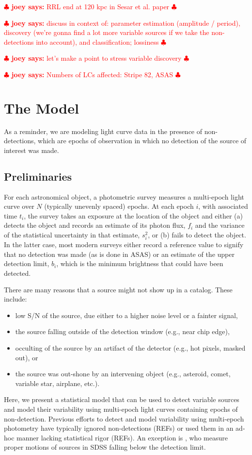 \documentclass[12pt,preprint]{aastex}
\newcommand{\fobs}{f_i}
\newcommand{\sobs}{s^2_i}
\newcommand{\joey}[1] { \textcolor{red} {
\ensuremath{\clubsuit} {\bf joey says:}  {#1}
\ensuremath{\clubsuit} } }%
\begin{document}
\joey{RRL end at 120 kpc in Sesar et al. paper}

\joey{discuss in context of: parameter estimation (amplitude / period), discovery (we're gonna find a lot more variable sources if we take the non-detections into account), and classification; lossiness}

\joey{let's make a point to stress variable discovery}

\joey{Numbers of LCs affected: Stripe 82, ASAS}

\section{The Model}
\label{sec:model}

As a reminder, we are modeling light curve data in the presence of non-detections, which are epochs of observation in which no detection of the source of interest was made.

\subsection{Preliminaries}
\label{ss:prelim}

For each astronomical object, a photometric survey measures a multi-epoch light curve over $N$ (typically unevenly spaced) epochs.  At each epoch $i$, with associated time $t_i$, the survey takes an exposure at the location of the object and either (a) detects the object and records an estimate of its photon flux, $\fobs$ and the  variance of the statistical uncertainty in that estimate, $\sobs$, or (b) fails to detect the object.  In the latter case, most modern surveys either record a reference value to signify that no detection was made (as is done in ASAS) or an estimate of the upper detection limit, $b_i$, which is the minimum brightness that could have been detected.

There are many reasons that a source might not show up in a catalog.  These include:
\begin{itemize}
\item low S/N of the source, due either to a higher noise level or a fainter signal,
\item the source falling outside of the detection window (e.g., near chip edge),
\item occulting of the source by an artifact of the detector (e.g., hot pixels, masked out), or
\item the source was out-shone by an intervening object (e.g., asteroid, comet, variable star, airplane, etc.).
\end{itemize}
Here, we present a statistical model that can be used to detect variable sources and model their variability using multi-epoch light curves containing epochs of non-detection.  Previous efforts to detect and model variability using multi-epoch photometry have typically ignored non-detections (REFs) or used them in an ad-hoc manner lacking statistical rigor (REFs).  An exception is \citet{2009AJ....137.4400L}, who measure proper motions of sources in SDSS falling below the detection limit.
\end{document}
